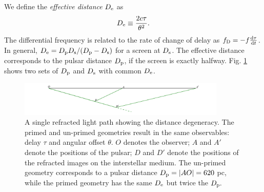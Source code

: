 \documentclass[useAMS,usenatbib]{mn2e}
\begin{document}
We define the {\it effective distance} $D_{\rm e}$ as
\begin{equation}
D_{\rm e} \equiv \frac{2c\tau}{\theta^2}.
\end{equation}
The differential frequency is related to the rate of change of delay
as $f_{\rm D}  =-f\frac{\rm d\tau}{\operatorname{d \!} t}$.    
In general, $D_{\rm e}={D_{\rm p} D_{\rm s}}/({D_{\rm p} - D_{\rm
    s}})$ for a screen at $D_{\rm s}$.  
    The effective distance
corresponds to the pulsar distance $D_{\rm p}$, if the screen is exactly halfway.  
Fig. \ref{fig:Singledegeneracy} shows two sets of $D_{\rm p}$ and $D_{\rm s}$ with common $D_{\rm e}$.

\begin{figure}
\centering
\hspace*{-0.4in}\includegraphics[width=3.9in]{single_degeneracy.pdf}
\caption{A single refracted light path showing the distance
  degeneracy.  The primed and un-primed geometries result in the same
  observables: delay $\tau$ and angular offset $\theta$.
$O$ denotes the observer; $A$ and $A'$ denote the positions of the
pulsar; $D$ and $D'$ denote the positions of the refracted images on the
interstellar medium. The un-primed geometry corresponds to a pulsar
distance $D_{\rm p} = |AO| = 620$ pc, while the primed geometry has the same $D_{\rm e}$ but twice the
$D_{\rm p}.$}
\label{fig:Singledegeneracy}
\end{figure}


\end{document}
